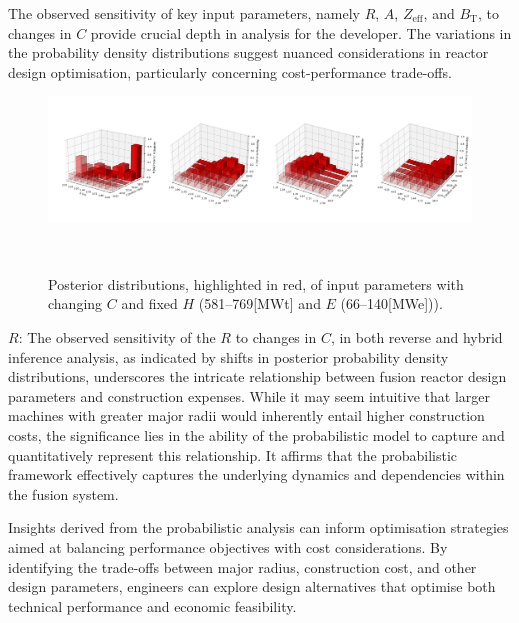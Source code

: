 \documentclass[journal]{IEEEtran}
\begin{document}
The observed sensitivity of key input parameters, namely $R$, $A$, $Z_{\text{eff}}$, and $B_{\text{T}}$, to changes in $C$ provide crucial depth in analysis for the developer. The variations in the probability density distributions suggest nuanced considerations in reactor design optimisation, particularly concerning cost-performance trade-offs. 

\begin{figure}[t]
    \centering
    \includegraphics[width=\textwidth]{figures/TE_results/march_data/3D_posteriors.png}
    \caption{\small Posterior distributions, highlighted in red, of input parameters with changing $C$ and fixed $H$ (581--769[MWt] and $E$ (66--140[MWe])).}~\label{fig:posterior_planes3}
\end{figure}

\textbf{$R$}: The observed sensitivity of the $R$ to changes in $C$, in both reverse and hybrid inference analysis, as indicated by shifts in posterior probability density distributions, underscores the intricate relationship between fusion reactor design parameters and construction expenses. While it may seem intuitive that larger machines with greater major radii would inherently entail higher construction costs, the significance lies in the ability of the probabilistic model to capture and quantitatively represent this relationship. It affirms that the probabilistic framework effectively captures the underlying dynamics and dependencies within the fusion system. 

Insights derived from the probabilistic analysis can inform optimisation strategies aimed at balancing performance objectives with cost considerations. By identifying the trade-offs between major radius, construction cost, and other design parameters, engineers can explore design alternatives that optimise both technical performance and economic feasibility.
\end{document}
